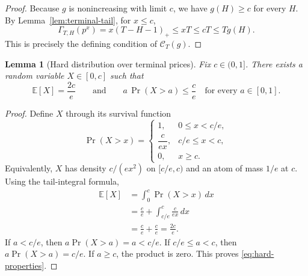 \documentclass[11pt]{article}
\newtheorem{lemma}[theorem]{Lemma}
\theoremstyle{remark}
\newcommand{\E}{\mathbb{E}}
\newcommand{\C}{\mathcal{C}}
\newcommand{\GammaTail}{\Gamma}
\begin{document}
\begin{proof}
Because $g$ is nonincreasing with limit $c$, we have $g(H)\ge c$ for every
$H$.  By Lemma~\ref{lem:terminal-tail}, for $x\le c$,
\[
    \GammaTail_{T,H}(p^x)
    =x(T-H-1)_+
    \le xT
    \le cT
    \le Tg(H).
\]
This is precisely the defining condition of $\C_T(g)$.
\end{proof}

\begin{lemma}[Hard distribution over terminal prices]\label{lem:hard-prior}
Fix $c\in(0,1]$.  There exists a random variable $X\in[0,c]$ such that
\begin{equation}\label{eq:hard-properties}
    \E[X]=\frac{2c}{e}
    \qquad\text{and}\qquad
    a\,\Pr(X>a)\le\frac{c}{e}
    \quad\text{for every }a\in[0,1].
\end{equation}
\end{lemma}

\begin{proof}
Define $X$ through its survival function
\[
    \Pr(X>x)
    =
    \begin{cases}
        1, & 0\le x<c/e,\\[1mm]
        \dfrac{c}{ex}, & c/e\le x<c,\\[2mm]
        0, & x\ge c.
    \end{cases}
\]
Equivalently, $X$ has density $c/(ex^2)$ on $[c/e,c)$ and an atom of mass
$1/e$ at $c$.  Using the tail-integral formula,
\begin{align*}
    \E[X]
    &=\int_0^c\Pr(X>x)\,dx\\
    &=\frac{c}{e}
      +\int_{c/e}^c\frac{c}{ex}\,dx\\
    &=\frac{c}{e}+\frac{c}{e}
    =\frac{2c}{e}.
\end{align*}
If $a<c/e$, then $a\Pr(X>a)=a<c/e$.  If $c/e\le a<c$, then
$a\Pr(X>a)=c/e$.  If $a\ge c$, the product is zero.  This proves
\eqref{eq:hard-properties}.
\end{proof}
\end{document}
